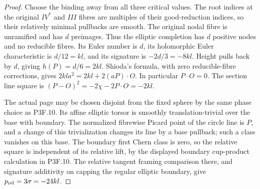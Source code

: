 \begin{proof}
Choose the binding away from all three critical values. The root indices at the original \(IV^*\) and \(III\) fibres are multiples of their good-reduction indices, so their relatively minimal pullbacks are smooth. The original nodal fibre is unramified and has \(d\) preimages. Thus the elliptic completion has \(d\) positive nodes and no reducible fibres. Its Euler number is \(d\), its holomorphic Euler characteristic is \(d/12=kl\), and its signature is \(-2d/3=-8kl\). Height pulls back by \(d\), giving \(h(P)=d/6=2kl\). Shioda's formula, with zero reducible-fibre corrections, gives \(2kl a^2=2kl+2(aP)\cdot O\). In particular \(P\cdot O=0\). The section line square is \((P-O)^2=-2\chi-2P\cdot O=-2kl\).

The actual page may be chosen disjoint from the fixed sphere by the same phase choice as P3F.10. Its affine elliptic torsor is smoothly translation-trivial over the base with boundary. The normalized fibrewise Picard point of the circle line is \(P\), and a change of this trivialization changes its line by a base pullback; such a class vanishes on this base. The boundary first Chern class is zero, so the relative square is independent of its relative lift, by the displayed boundary cup-product calculation in P3F.10. The relative tangent framing comparison there, and signature additivity on capping the regular elliptic boundary, give \(p_{\rm rel}=3\sigma=-24kl\).
\end{proof}
